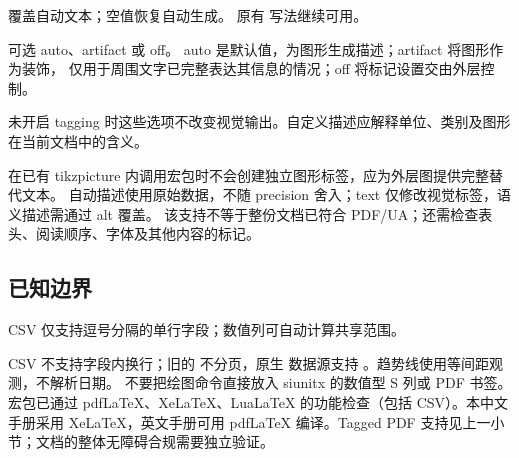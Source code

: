 
 覆盖自动文本；空值恢复自动生成。
原有  写法继续可用。

 可选 auto、artifact 或 off。
auto 是默认值，为图形生成描述；artifact 将图形作为装饰，
仅用于周围文字已完整表达其信息的情况；off 将标记设置交由外层控制。

未开启 tagging 时这些选项不改变视觉输出。自定义描述应解释单位、类别及图形在当前文档中的含义。

在已有 tikzpicture 内调用宏包时不会创建独立图形标签，应为外层图提供完整替代文本。
自动描述使用原始数据，不随 precision 舍入；text 仅修改视觉标签，语义描述需通过 alt 覆盖。
该支持不等于整份文档已符合 PDF/UA；还需检查表头、阅读顺序、字体及其他内容的标记。

\subsection{已知边界}
CSV 仅支持逗号分隔的单行字段；数值列可自动计算共享范围。

CSV 不支持字段内换行；旧的  不分页，原生  数据源支持 。趋势线使用等间距观测，不解析日期。
不要把绘图命令直接放入 siunitx 的数值型 S 列或 PDF 书签。
宏包已通过 pdfLaTeX、XeLaTeX、LuaLaTeX 的功能检查（包括 CSV）。本中文手册采用 XeLaTeX，英文手册可用 pdfLaTeX 编译。Tagged PDF 支持见上一小节；文档的整体无障碍合规需要独立验证。
